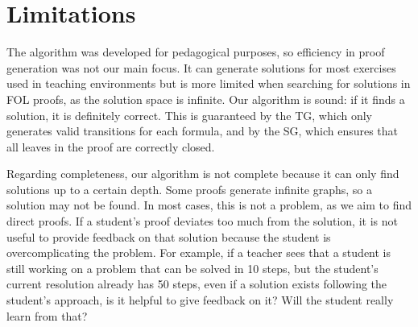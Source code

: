 \section{Limitations}
The algorithm was developed for pedagogical purposes, so efficiency in proof generation was not our main focus. It can generate solutions for most exercises used in teaching environments but is more limited when searching for solutions in FOL proofs, as the solution space is infinite. Our algorithm is sound: if it finds a solution, it is definitely correct. This is guaranteed by the TG, which only generates valid transitions for each formula, and by the SG, which ensures that all leaves in the proof are correctly closed.

Regarding completeness, our algorithm is not complete because it can only find solutions up to a certain depth. Some proofs generate infinite graphs, so a solution may not be found. In most cases, this is not a problem, as we aim to find direct proofs. If a student’s proof deviates too much from the solution, it is not useful to provide feedback on that solution because the student is overcomplicating the problem. For example, if a teacher sees that a student is still working on a problem that can be solved in 10 steps, but the student’s current resolution already has 50 steps, even if a solution exists following the student’s approach, is it helpful to give feedback on it? Will the student really learn from that? 